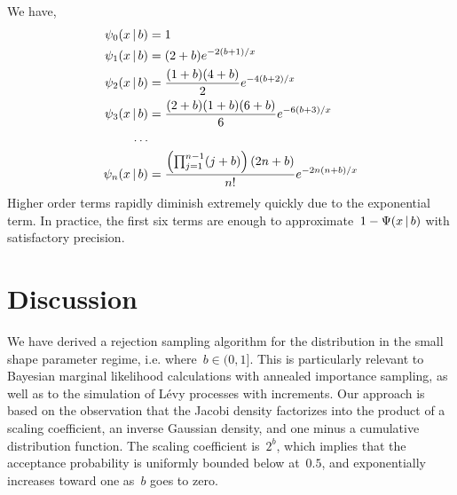 \documentclass[aos,preprint]{imsart}
\begin{document}
We have,
\begin{align}
\psi_0(x \given b) &= 1 \\
\psi_1(x \given b) &= (2+b) e^{-2(b+1) / x} \\
\psi_2(x \given b) &= \frac{(1+b)(4+b)}{2} e^{-4(b+2) / x} \\
\psi_3(x \given b) &= \frac{(2+b)(1+b)(6+b)}{6} e^{-6(b+3) / x} \\
\nonumber \ldots & \\
\psi_n(x \given b) &= \frac{\left(\prod_{j=1}^{n-1} (j+b) \right) (2n+b)}{n!} e^{-2n(n+b)/x} 
\end{align}
Higher order terms rapidly diminish extremely quickly due to the
exponential term. In practice, the first six terms are enough to
approximate~$1-\Psi(x \,|\, b)$ with satisfactory precision. 

\section{Discussion}
We have derived a rejection sampling algorithm for the \polyagamma distribution 
in the small shape parameter regime, i.e. where~$b \in (0,1]$. This is 
particularly relevant to Bayesian marginal likelihood calculations with 
annealed importance sampling, as well as to the simulation of L\'{e}vy 
processes with \polyagamma increments. Our approach is based on the observation 
that the Jacobi density factorizes into the product of a scaling coefficient, 
an inverse Gaussian density, and one minus a cumulative distribution function.
The scaling coefficient is~$2^b$, which implies that the acceptance probability 
is uniformly bounded below at~$0.5$, and exponentially increases toward one 
as~$b$ goes to zero. 



\end{document}
